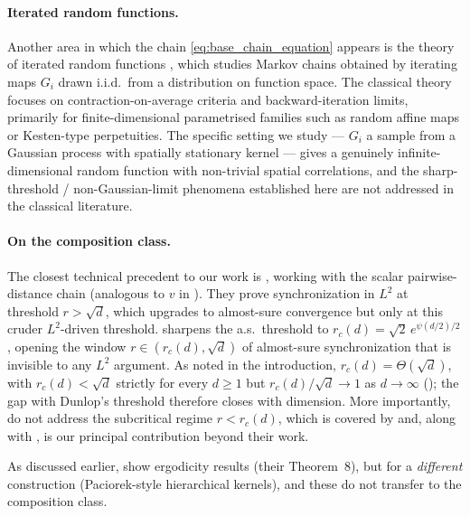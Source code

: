\documentclass{article}
\begin{document}
\paragraph{Iterated random functions.}
Another area in which the chain \eqref{eq:base_chain_equation} appears is the theory of iterated random functions \citep{diaconis1999iterated,wushao2004limit,stenflo2012survey}, which studies Markov chains obtained by iterating maps $G_i$ drawn i.i.d.\ from a distribution on function space. The classical theory focuses on contraction-on-average criteria and backward-iteration limits, primarily for finite-dimensional parametrised families such as random affine maps or Kesten-type perpetuities. The specific setting we study --- $G_i$ a sample from a Gaussian process with spatially stationary kernel --- gives a genuinely infinite-dimensional random function with non-trivial spatial correlations, and the sharp-threshold / non-Gaussian-limit phenomena established here are not addressed in the classical literature.

\paragraph{On the composition class.}
The closest technical precedent to our work is \citet{dunlop2018how}, working with the scalar pairwise-distance chain (analogous to $v$ in ). They prove synchronization in $L^2$ at threshold $r > \sqrt{d}$, which upgrades to almost-sure convergence but only at this cruder $L^2$-driven threshold.  sharpens the a.s.\ threshold to $r_c(d) = \sqrt{2}\, e^{\psi(d/2)/2}$, opening the window $r \in (r_c(d), \sqrt{d})$ of almost-sure synchronization that is invisible to any $L^2$ argument. As noted in the introduction, $r_c(d) = \Theta(\sqrt{d})$, with $r_c(d) < \sqrt{d}$ strictly for every $d \ge 1$ but $r_c(d)/\sqrt{d} \to 1$ as $d \to \infty$ (); the gap with Dunlop's threshold therefore closes with dimension. More importantly, \citet{dunlop2018how} do not address the subcritical regime $r < r_c(d)$, which is covered by  and, along with , is our principal contribution beyond their work.

As discussed earlier, \citet{dunlop2018how} show ergodicity results (their Theorem~8), but for a \emph{different} construction (Paciorek-style hierarchical kernels), and these do not transfer to the composition class.
\end{document}
